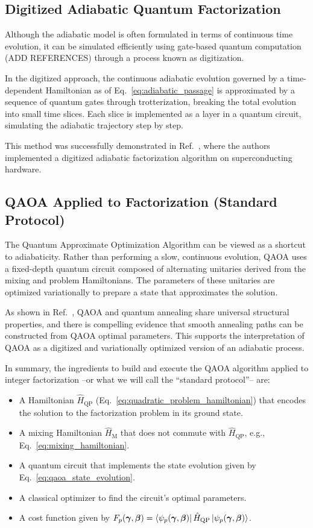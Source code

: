 \subsection{Digitized Adiabatic Quantum Factorization}
Although the adiabatic model is often formulated in terms of continuous time evolution, it
can be simulated efficiently using gate-based quantum computation {\color{red} (ADD REFERENCES)}
through a process known as digitization.

In the digitized approach, the continuous adiabatic evolution governed by a time-dependent
Hamiltonian as of Eq.~\ref{eq:adiabatic_passage} is approximated by a sequence of quantum
gates through trotterization, breaking the total evolution into small time slices. Each slice
is implemented as a layer in a quantum circuit, simulating the adiabatic trajectory step
by step.

This method was successfully demonstrated in Ref.~\cite{hegade_digitized_2021}, where
the authors implemented a digitized adiabatic factorization algorithm on superconducting
hardware.

\subsection{QAOA Applied to Factorization (Standard Protocol)}
The Quantum Approximate Optimization Algorithm can be viewed as a shortcut to adiabaticity.
Rather than performing a slow, continuous evolution, QAOA uses a fixed-depth quantum
circuit composed of alternating unitaries derived from the mixing and problem Hamiltonians.
The parameters of these unitaries are optimized variationally to prepare a state that
approximates the solution.

As shown in Ref.~\cite{diez-valle_universal_2025}, QAOA and quantum annealing share universal
structural properties, and there is compelling evidence that smooth annealing paths can be constructed
from QAOA optimal parameters. This supports the interpretation of QAOA as a digitized
and variationally optimized version of an adiabatic process.

In summary, the ingredients to build and execute the QAOA algorithm applied to integer factorization --or what we
will call the ``standard protocol''-- are:
\begin{itemize}
    \item A Hamiltonian $\hat{H}_\mathrm{QP}$ (Eq.~\ref{eq:quadratic_problem_hamiltonian}) that encodes the solution to the factorization problem in its ground state.
    \item A mixing Hamiltonian $\hat{H}_\mathrm{M}$ that does not commute with $\hat{H}_\mathrm{QP}$, e.g., Eq.~\ref{eq:mixing_hamiltonian}.
    \item A quantum circuit that implements the state evolution given by Eq.~\ref{eq:qaoa_state_evolution}.
    \item A classical optimizer to find the circuit's optimal parameters.
    \item A cost function given by $F_p (\bm{\gamma}, \bm{\beta}) = \bra{\psi_p (\bm{\gamma}, \bm{\beta})} \hat{H}_\mathrm{QP} \ket{\psi_p (\bm{\gamma}, \bm{\beta})}$.
\end{itemize}

